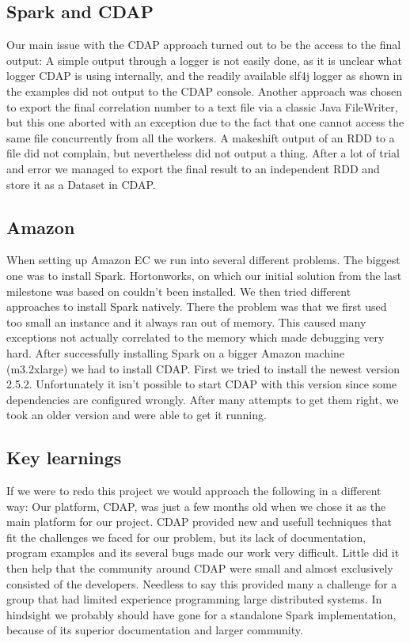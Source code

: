 \documentclass[
10pt, %
a4paper, %
oneside, %
headinclude,footinclude, %
useAMS,
usenatbib
]{mn2e}  %
\begin{document}
\subsection{Spark and CDAP}
Our main issue with the CDAP approach turned out to be the access to the final output: A simple output through a logger is not easily done, as it is unclear what logger CDAP is using internally, and the readily available slf4j logger as shown in the examples did not output to the CDAP console. Another approach was chosen to export the final correlation number to a text file via a classic Java FileWriter, but this one aborted with an exception due to the fact that one cannot access the same file concurrently from all the workers. A makeshift output of an RDD to a file did not complain, but nevertheless did not output a thing.
After a lot of trial and error we managed to export the final result to an independent RDD and store it as a Dataset in CDAP.

\subsection{Amazon}
When setting up Amazon EC we run into several different problems. The biggest one was to install Spark. Hortonworks, on which our initial solution from the last milestone was based on couldn’t been installed. We then tried different approaches to install Spark natively. There the problem was that we first used too small an instance and it always ran out of memory. This caused many exceptions not actually correlated to the memory which made debugging very hard. After successfully installing Spark on a bigger Amazon machine (m3.2xlarge) we had to install CDAP. First we tried to install the newest version 2.5.2. Unfortunately it isn’t possible to start CDAP with this version since some dependencies are configured wrongly. After many attempts to get them right, we took an older version and were able to get it running.

\subsection{Key learnings}
If we were to redo this project we would approach the following in a different way:
Our platform, CDAP, was just a few months old when we chose it as the main platform for our project. CDAP provided new and usefull techniques that fit the challenges we faced for our problem, but its lack of documentation, program examples and its several bugs made our work very difficult. Little did it then help that the community around CDAP were small and almost exclusively consisted of the developers.
Needless to say this provided many a challenge for a group that had limited experience programming large distributed systems. In hindsight we probably should have gone for a standalone Spark implementation, because of its superior documentation and larger community.
\end{document}
